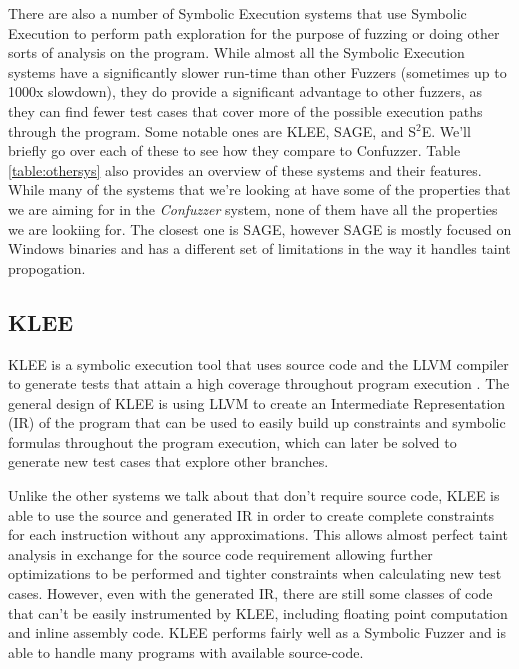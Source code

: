 There are also a number of Symbolic Execution systems that use Symbolic
Execution to perform path exploration for the purpose of fuzzing or doing other
sorts of analysis on the program. While almost all the Symbolic Execution
systems have a significantly slower run-time than other Fuzzers (sometimes up to
1000x slowdown), they do provide a significant advantage to other fuzzers, as
they can find fewer test cases that cover more of the possible execution paths
through the program. Some notable ones are KLEE, SAGE, and S$^2$E. We'll briefly go
over each of these to see how they compare to Confuzzer. Table
\ref{table:othersys} also provides an overview of these systems and their
features. While many of the systems that we're looking at have some of the
properties that we are aiming for in the \textit{Confuzzer} system, none of them
have all the properties we are lookiing for. The closest one is SAGE, however
SAGE is mostly focused on Windows binaries and has a different set of
limitations in the way it handles taint propogation.

\subsection{KLEE}
KLEE is a symbolic execution tool that uses source code and the LLVM compiler to
generate tests that attain a high coverage throughout program execution
\cite{klee}. The general design of KLEE is using LLVM to create an Intermediate
Representation (IR) of the program that can be used to easily build up constraints
and symbolic formulas throughout the program execution, which can later be
solved to generate new test cases that explore other branches.

Unlike the other systems we talk about that don't require source code, KLEE is
able to use the source and generated IR in order to create complete constraints
for each instruction without any approximations. This allows almost perfect
taint analysis in exchange for the source code requirement allowing further
optimizations to be performed and tighter constraints when calculating new test
cases. However, even with the generated IR, there are still some classes of code
that can't be easily instrumented by KLEE, including floating point computation
and inline assembly code. KLEE performs fairly well as a Symbolic Fuzzer and is
able to handle many programs with available source-code.

